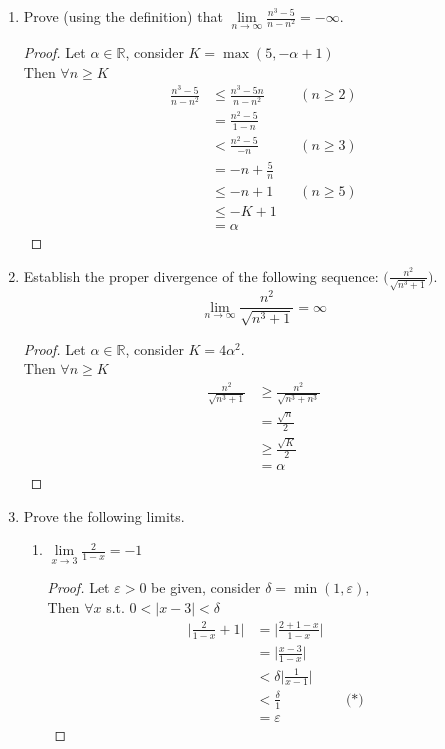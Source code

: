 \documentclass[12pt]{article}
\begin{document}
\begin{enumerate}
    \item Prove (using the definition) that $\lim\limits_{n \to \infty} \frac{n^3-5}{n-n^2} = -\infty$.
    \begin{proof}
        Let $\alpha \in \mathbb{R}$, consider $K = \max(5, -\alpha+1)$ \\
        Then $\forall n \geq K$
        \begin{align*}
            \frac{n^3-5}{n-n^2} &\leq \frac{n^3-5n}{n-n^2} && (n \geq 2) \\
            &= \frac{n^2-5}{1-n} \\
            &< \frac{n^2-5}{-n} && (n \geq 3) \\
            &= -n + \frac{5}{n} \\
            &\leq -n+1 && (n \geq 5) \\
            &\leq -K+1 \\
            &= \alpha
        \end{align*}
    \end{proof}

    \item Establish the proper divergence of the following sequence: $\Big(\frac{n^2}{\sqrt{n^3+1}} \Big)$.
    \[\lim_{n \to \infty} \frac{n^2}{\sqrt{n^3+1}} = \infty \]
    \begin{proof}
        Let $\alpha \in \mathbb{R}$, consider $K = 4\alpha^2$. \\
        Then $\forall n \geq K$
        \begin{align*}
            \frac{n^2}{\sqrt{n^3+1}} &\geq \frac{n^2}{\sqrt{n^3+n^3}} \\
            &= \frac{\sqrt{n}}{2} \\
            &\geq \frac{\sqrt{K}}{2} \\
            &= \alpha
        \end{align*}
    \end{proof}

    \item Prove the following limits.
    \begin{enumerate}
        \item $\lim\limits_{x \to 3} \frac{2}{1-x} = -1$
        \begin{proof}
            Let $\varepsilon > 0$ be given, consider $\delta = \min(1, \varepsilon) $, \\
            Then $\forall x$ s.t. $0 < |x-3| < \delta$
            \begin{align*}
                \bigg| \frac{2}{1-x} + 1 \bigg| &= \bigg| \frac{2+1-x}{1-x} \bigg| \\
                &= \bigg| \frac{x-3}{1-x} \bigg| \\
                &< \delta \bigg| \frac{1}{x-1} \bigg| \\
                &< \frac{\delta}{1} && \text{(*)} \\
                &= \varepsilon
            \end{align*}


\end{proof}
\end{enumerate}
\end{enumerate}
\end{document}
